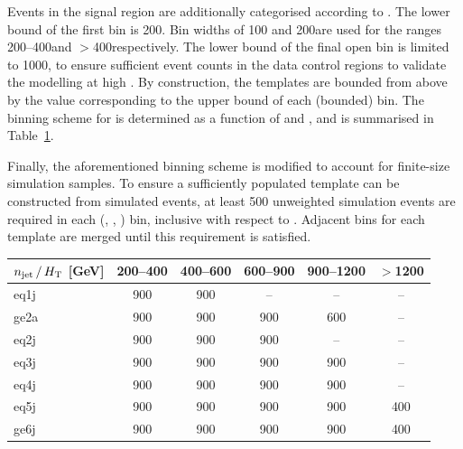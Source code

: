 Events in the signal region are additionally categorised according to
\HTmiss. The lower bound of the first \HTmiss bin is 200\GeV. Bin
widths of 100 and 200\GeV are used for the ranges 200--400\GeV and
$>$400\GeV respectively. The lower bound of the final open bin is
limited to 1000\GeV, to ensure sufficient event counts in the data
control regions to validate the modelling at high \HTmiss. By
construction, the \HTmiss templates are bounded from above by the
value corresponding to the upper bound of each (bounded) \scalht
bin. The binning scheme for \HTmiss is determined as a function of
\njet and \scalht, and is summarised in Table~\ref{tab:mht-binning}.

Finally, the aforementioned \HTmiss binning scheme is modified to
account for finite-size simulation samples. To ensure a sufficiently
populated \HTmiss template can be constructed from simulated events,
at least 500 unweighted simulation events are required in each (\njet,
\scalht, \MHT) bin, inclusive with respect to \nb. Adjacent \HTmiss
bins for each template are merged until this requirement is satisfied.

\begin{table}[!h]
  \label{tab:mht-binning}
  \centering
  \begin{tabular}{ lccccc }
    \hline
    $n_{\text{jet}}\, / \,\mbox{$H_\text{T}$}$ [GeV] & 200--400 & 400--600 & 600--900 & 900--1200 & $>$1200 \\
    \hline
    eq1j                        & 900      & 900      & --       & --        & --      \\ 
    ge2a                        & 900      & 900      & 900      & 600       & --      \\ 
    eq2j                        & 900      & 900      & 900      & --        & --      \\ 
    eq3j                        & 900      & 900      & 900      & 900       & --      \\ 
    eq4j                        & 900      & 900      & 900      & 900       & --      \\ 
    eq5j                        & 900      & 900      & 900      & 900       & 400     \\ 
    ge6j                        & 900      & 900      & 900      & 900       & 400     \\ 
    \hline
  \end{tabular}
\end{table}


